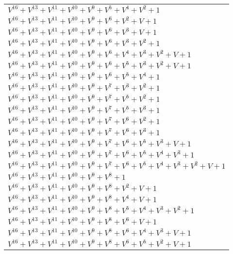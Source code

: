 \documentclass[12pt]{article}
\begin{document}
\begin{adjustwidth}{-4cm}{}
\begin{center}
\begin{longtable}{|l|}
$V^{16}  +V^{13}  +V^{11}  +V^{10}  +V^{9}  +V^{5}  +V^{4}  +V^{2}  + 1$ \\
$V^{16}  +V^{13}  +V^{11}  +V^{10}  +V^{9}  +V^{6}  +V^{2}  + V + 1$ \\
$V^{16}  +V^{13}  +V^{11}  +V^{10}  +V^{9}  +V^{6}  +V^{3}  + V + 1$ \\
$V^{16}  +V^{13}  +V^{11}  +V^{10}  +V^{9}  +V^{6}  +V^{3}  +V^{2}  + 1$ \\
$V^{16}  +V^{13}  +V^{11}  +V^{10}  +V^{9}  +V^{6}  +V^{4}  +V^{3}  +V^{2}  + V + 1$ \\
$V^{16}  +V^{13}  +V^{11}  +V^{10}  +V^{9}  +V^{6}  +V^{5}  +V^{3}  +V^{2}  + V + 1$ \\
$V^{16}  +V^{13}  +V^{11}  +V^{10}  +V^{9}  +V^{6}  +V^{5}  +V^{4}  + 1$ \\
$V^{16}  +V^{13}  +V^{11}  +V^{10}  +V^{9}  +V^{7}  +V^{3}  +V^{2}  + 1$ \\
$V^{16}  +V^{13}  +V^{11}  +V^{10}  +V^{9}  +V^{7}  +V^{5}  +V^{2}  + 1$ \\
$V^{16}  +V^{13}  +V^{11}  +V^{10}  +V^{9}  +V^{7}  +V^{5}  +V^{3}  + 1$ \\
$V^{16}  +V^{13}  +V^{11}  +V^{10}  +V^{9}  +V^{7}  +V^{6}  +V^{2}  + 1$ \\
$V^{16}  +V^{13}  +V^{11}  +V^{10}  +V^{9}  +V^{7}  +V^{6}  +V^{3}  + 1$ \\
$V^{16}  +V^{13}  +V^{11}  +V^{10}  +V^{9}  +V^{7}  +V^{6}  +V^{5}  +V^{3}  + V + 1$ \\
$V^{16}  +V^{13}  +V^{11}  +V^{10}  +V^{9}  +V^{7}  +V^{6}  +V^{5}  +V^{4}  +V^{3}  + 1$ \\
$V^{16}  +V^{13}  +V^{11}  +V^{10}  +V^{9}  +V^{7}  +V^{6}  +V^{5}  +V^{4}  +V^{3}  +V^{2}  + V + 1$ \\
$V^{16}  +V^{13}  +V^{11}  +V^{10}  +V^{9}  +V^{8}  + 1$ \\
$V^{16}  +V^{13}  +V^{11}  +V^{10}  +V^{9}  +V^{8}  +V^{2}  + V + 1$ \\
$V^{16}  +V^{13}  +V^{11}  +V^{10}  +V^{9}  +V^{8}  +V^{4}  + V + 1$ \\
$V^{16}  +V^{13}  +V^{11}  +V^{10}  +V^{9}  +V^{8}  +V^{5}  +V^{4}  +V^{3}  +V^{2}  + 1$ \\
$V^{16}  +V^{13}  +V^{11}  +V^{10}  +V^{9}  +V^{8}  +V^{6}  + V + 1$ \\
$V^{16}  +V^{13}  +V^{11}  +V^{10}  +V^{9}  +V^{8}  +V^{6}  +V^{4}  +V^{3}  + V + 1$ \\
$V^{16}  +V^{13}  +V^{11}  +V^{10}  +V^{9}  +V^{8}  +V^{6}  +V^{5}  +V^{2}  + V + 1$ \\

\end{longtable}
\end{center}
\end{adjustwidth}
\end{document}
